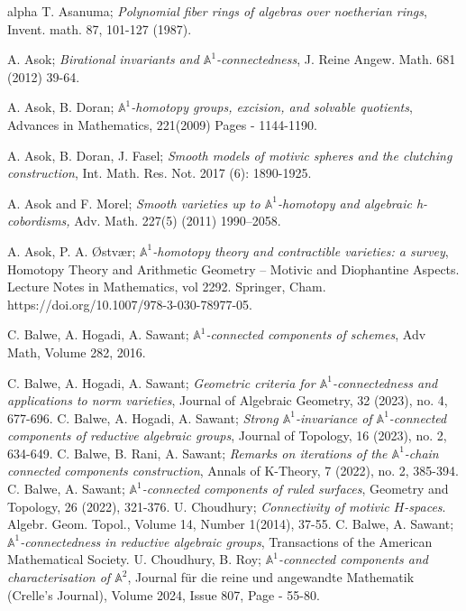 \documentclass[11pt, reqno]{amsart}
\theoremstyle{plain}
\theoremstyle{definition}
\newcommand{\A}{{\mathbb A}}
\begin{document}
	
	





		

	\begin{thebibliography}{alpha}
		 T. Asanuma; \emph{Polynomial fiber rings of algebras over noetherian rings}, Invent. math. 87, 101-127 (1987).
		
		 A. Asok; \emph{Birational invariants and $\mathbb{A}^1$-connectedness}, J. Reine Angew. Math. 681 (2012) 39-64.
		
		 A. Asok, B. Doran; \emph{$\mathbb{A}^1$-homotopy groups, excision, and solvable quotients}, Advances in Mathematics, 221(2009) Pages - 1144-1190.
		
		
		 A. Asok, B. Doran, J. Fasel;  \emph{Smooth models of motivic spheres and the clutching construction}, Int. Math. Res. Not. 2017 (6): 1890-1925. 
		
		 A. Asok and F. Morel; \emph{Smooth varieties up to $\mathbb{A}^{1}$-homotopy and algebraic h-cobordisms,} Adv. Math. 227(5) (2011) 1990–2058.
		
		 A. Asok, P. A. \O stv\ae r; \emph{$\mathbb{A}^1$-homotopy theory and contractible varieties: a survey}, Homotopy Theory and Arithmetic Geometry – Motivic and Diophantine Aspects. Lecture Notes in Mathematics, vol 2292. Springer, Cham. https://doi.org/10.1007/978-3-030-78977-05.
		
		
		 C. Balwe, A. Hogadi, A. Sawant; \emph{$\mathbb{A}^1$-connected components of schemes}, Adv Math, Volume 282, 2016.
		
		 C. Balwe, A. Hogadi, A. Sawant; \emph{Geometric criteria for $\mathbb{A}^1$-connectedness and applications to norm varieties}, Journal of Algebraic Geometry, 32 (2023), no. 4, 677-696.
		 C. Balwe, A. Hogadi, A. Sawant; \emph{Strong $\mathbb{A}^1$-invariance of $\mathbb{A}^1$-connected components of reductive algebraic groups}, Journal of Topology, 16 (2023), no. 2, 634-649.
		C. Balwe, B. Rani, A. Sawant;\emph{ Remarks on iterations of the $\mathbb{A}^1$-chain connected components construction}, Annals of K-Theory, 7 (2022), no. 2, 385-394.
		 C. Balwe, A. Sawant; \emph{$\mathbb{A}^1$-connected components of ruled surfaces}, Geometry and Topology, 26 (2022), 321-376.
		 U. Choudhury; \emph{Connectivity of motivic $H$-spaces}. Algebr. Geom. Topol., Volume 14, Number 1(2014), 37-55.
 C. Balwe, A. Sawant; \emph{$\A^1$-connectedness in reductive algebraic groups}, Transactions of the American Mathematical Society.
		 U. Choudhury, B. Roy; \emph{$\mathbb{A}^1$-connected components and characterisation of $\mathbb{A}^2$}, Journal für die reine und angewandte Mathematik (Crelle's Journal), Volume 2024, Issue 807, Page - 55-80. 
		

\end{thebibliography}
\end{document}
